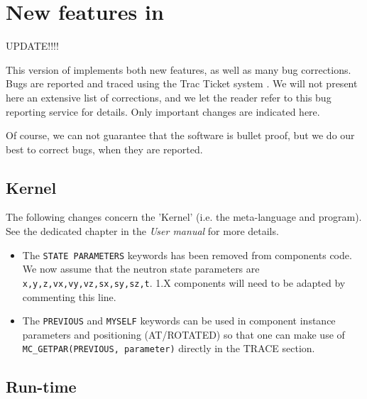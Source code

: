 
\chapter{New features in \MCS \version\ }
\label{c:changes}

UPDATE!!!!

This version of \MCS implements both new features, as well as many bug corrections. Bugs are reported and traced using the \MCS Trac Ticket system \cite{mczilla_webpage}. We will not present here an extensive list of corrections, and we let the reader refer to this bug reporting service for details. Only important changes are indicated here.

Of course, we can not guarantee that the software is bullet proof, but we do our best to correct bugs, when they are reported.


\section{Kernel}
\label{s:new-features:kernel}

The following changes concern the 'Kernel' (i.e. the \MCS meta-language and program). See the dedicated chapter in the {\it User manual} for more details.

\begin{itemize}
\item The \verb+STATE PARAMETERS+ keywords has been removed from components code. We now assume that the neutron state parameters are \verb+x,y,z,vx,vy,vz,sx,sy,sz,t+. \MCS 1.X components will need to be adapted by commenting this line.
\item The \verb+PREVIOUS+ and \verb+MYSELF+ keywords can be used in component instance parameters and positioning (AT/ROTATED) so that one can make use of \verb+MC_GETPAR(PREVIOUS, parameter)+ directly in the TRACE section.
\end{itemize}

\section{Run-time}
\label{s:new-features:run-time}

